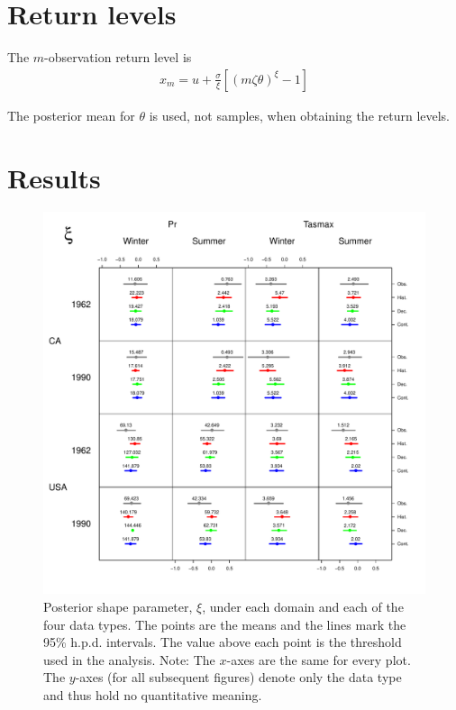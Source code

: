 \documentclass[12pt]{article}
\begin{document}
\section{Return levels}
\label{return}

The $m$-observation return level is
\begin{align}
x_m = u +\frac{\sigma}{\xi}\left[\left(m\zeta\theta\right)^\xi-1\right] \label{rl}
\end{align}

The posterior mean for $\theta$ is used, not samples, when obtaining the return levels.


\section{Results}
\label{results}

\begin{figure}
\begin{center}
\includegraphics[scale=0.72]{figs/shape.pdf}
\end{center}
\caption{Posterior shape parameter, $\xi$, under each domain and each of the four data types. The points are the means and the lines mark the 95\% h.p.d. intervals. The value above each point is the threshold used in the analysis. Note: The $x$-axes are the same for every plot. The $y$-axes (for all subsequent figures) denote only the data type and thus hold no quantitative meaning.}
\label{ksi}
\end{figure}
\end{document}
